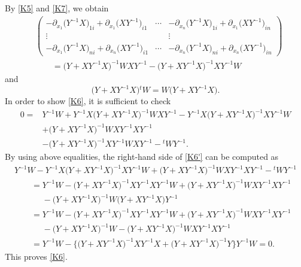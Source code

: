 \documentclass[pdftex]{sigma}
\numberwithin{equation}{section}
\begin{document}
By \eqref{K5} and \eqref{K7}, we obtain
\begin{align*}
&\begin{pmatrix}
-\partial_{x_1}\bigl(Y^{-1}X\bigr)_{1i}+\partial_{x_1}\bigl(XY^{-1}\bigr)_{i1} & \cdots & -\partial_{x_n}\bigl(Y^{-1}X\bigr)_{1i}+\partial_{x_1}\bigl(XY^{-1}\bigr)_{in} \\
\vdots & & \vdots \\
-\partial_{x_1}\bigl(Y^{-1}X\bigr)_{ni}+\partial_{x_n}\bigl(XY^{-1}\bigr)_{i1} & \cdots & -\partial_{x_n}\bigl(Y^{-1}X\bigr)_{ni}+\partial_{x_n}\bigl(XY^{-1}\bigr)_{in}
\end{pmatrix}\\
&\qquad=\bigl(Y+XY^{-1}X\bigr)^{-1}WXY^{-1}-\bigl(Y+XY^{-1}X\bigr)^{-1}XY^{-1}W
\end{align*}
and
\[
\bigl(Y+XY^{-1}X\bigr){}^tW=W\bigl(Y+XY^{-1}X\bigr).
\]
In order to show \eqref{K6}, it is sufficient to check
\begin{align}
0={}&Y^{-1}W+Y^{-1}X\bigl(Y+XY^{-1}X\bigr)^{-1}WXY^{-1}-Y^{-1}X\bigl(Y+XY^{-1}X\bigr)^{-1}XY^{-1}W\nonumber\\
&+\bigl(Y+XY^{-1}X\bigr)^{-1}WXY^{-1}XY^{-1}\nonumber\\
&-\bigl(Y+XY^{-1}X\bigr)^{-1}XY^{-1}WXY^{-1}-{}^tWY^{-1}.\label{K6'}
\end{align}
By using above equalities, the right-hand side of \eqref{K6'} can be computed as
\begin{gather*}
Y^{-1}W-Y^{-1}X\bigl(Y+XY^{-1}X\bigr)^{-1}XY^{-1}W+\bigl(Y+XY^{-1}X\bigr)^{-1}WXY^{-1}XY^{-1}-{}^tWY^{-1}\\
\qquad=Y^{-1}W-\bigl(Y+XY^{-1}X\bigr)^{-1}XY^{-1}XY^{-1}W+\bigl(Y+XY^{-1}X\bigr)^{-1}WXY^{-1}XY^{-1}\\
\phantom{\qquad=}{}-\bigl(Y+XY^{-1}X\bigr)^{-1}W\bigl(Y+XY^{-1}X\bigr)Y^{-1}\\
\qquad=Y^{-1}W-\bigl(Y+XY^{-1}X\bigr)^{-1}XY^{-1}XY^{-1}W+\bigl(Y+XY^{-1}X\bigr)^{-1}WXY^{-1}XY^{-1}\\
\phantom{\qquad=}{}-\bigl(Y+XY^{-1}X\bigr)^{-1}W-\bigl(Y+XY^{-1}X\bigr)^{-1}WXY^{-1}XY^{-1}\\
\qquad=Y^{-1}W-\big\{\bigl(Y+XY^{-1}X\bigr)^{-1}XY^{-1}X +\bigl(Y+XY^{-1}X\bigr)^{-1}Y \big\}Y^{-1}W=0.
\end{gather*}
This proves \eqref{K6}.
\end{document}

